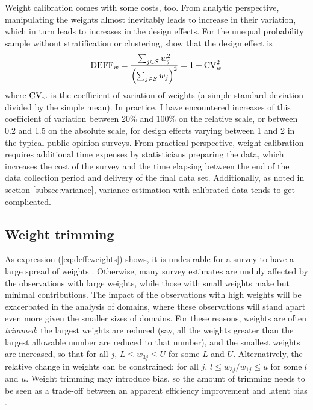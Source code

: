 Weight calibration comes with some costs, too. From analytic perspective,
manipulating the weights almost inevitably leads to increase in their
variation, which in turn leads to increases in the design effects.
For the unequal probability sample without stratification or clustering,
\citet{korn:graubard:1999} show that the design effect is
\begin{equation}
    {\rm DEFF}_w = \frac{\sum_{j \in \mathcal{S}} w_j^2 }%
       {\Bigl(\sum_{j \in \mathcal{S}} w_j\Bigr)^2}
    = 1 + {\rm CV}_w^2
    \label{eq:deff:weights}
\end{equation}
where ${\rm CV}_w$ is the coefficient of variation of weights
(a simple standard deviation divided by the simple mean).
In practice, I have encountered increases of this coefficient
of variation between 20\% and 100\% on the relative scale,
or between 0.2 and 1.5 on the absolute scale, for design effects
varying between 1 and 2 in the typical public opinion surveys.
From practical perspective, weight calibration requires
additional time expenses by statisticians preparing the data,
which increases the cost of the survey and the time elapsing
between the end of the data collection period and delivery
of the final data set. Additionally, as noted in section
\ref{subsec:variance}, variance estimation with calibrated
data tends to get complicated.

\subsection{Weight trimming}
\label{subsec:trimming}

As expression (\ref{eq:deff:weights}) shows, it is undesirable
for a survey to have a large spread of weights \citep{theberge:2000}.
Otherwise, many survey
estimates are unduly affected by the observations with large weights,
while those with small weights make but minimal contributions.
The impact of the observations with high weights will be exacerbated
in the analysis of domains, where these observations will stand apart
even more given the smaller sizes of domains.
For these reasons, weights are often {\it trimmed}: the largest
weights are reduced (say, all the weights greater than the largest allowable
number are reduced to that number), and the smallest weights are increased,
so that for all $j$, $L \le w_{3j} \le U$ for some $L$ and $U$.
Alternatively, the relative change in weights can be constrained:
for all $j$, $l \le w_{3j}/w_{1j} \le u$ for some $l$ and $u$.
Weight trimming may introduce bias, so the amount of trimming needs to be
seen as a trade-off between an apparent efficiency improvement
and latent bias \citep{elliott:2008}.

